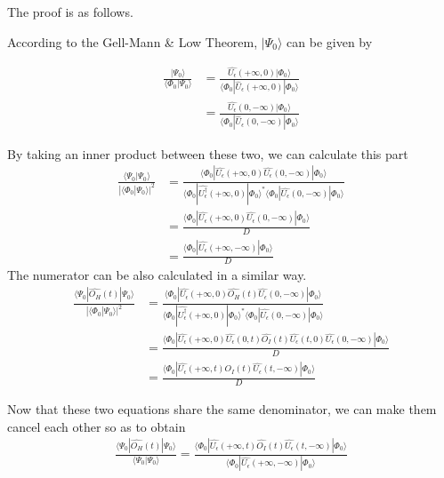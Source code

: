The proof is as follows.

According to the Gell-Mann \& Low Theorem, $|\Psi_0\rangle$ can be given by

\begin{align}
\frac{|\Psi_0\rangle}{\langle\Phi_0|\Psi_0\rangle}&=\frac{\hat{U_{\epsilon}}(+\infty,0)|\Phi_0\rangle}{\langle\Phi_0|\hat U_{\epsilon}(+\infty,0)|\Phi_0\rangle} \nonumber \\
&=\frac{\hat{U_{\epsilon}}(0,-\infty)|\Phi_0\rangle}{\langle\Phi_0|\hat U_{\epsilon}(0,-\infty)|\Phi_0\rangle} \nonumber
\end{align}

By taking an inner product between these two, we can calculate this part
\begin{align}
\frac{\langle\Psi_0|\Psi_0\rangle}{|\langle\Phi_0|\Psi_0\rangle|^2}&=\frac{\langle\Phi_0|\hat{U_{\epsilon}}(+\infty,0)\hat{U_{\epsilon}}(0,-\infty)|\Phi_0\rangle}{\langle\Phi_0|\hat{U^{\dagger}_{\epsilon}}(+\infty,0)|\Phi_0\rangle^*\langle\Phi_0|\hat{U_{\epsilon}}(0,-\infty)|\Phi_0\rangle} \nonumber \\
&=\frac{\langle\Phi_0|\hat{U_{\epsilon}}(+\infty,0)\hat{U_{\epsilon}}(0,-\infty)|\Phi_0\rangle}{D} \nonumber \\
&= \frac{\langle\Phi_0|\hat{U_{\epsilon}}(+\infty,-\infty)|\Phi_0\rangle}{D} \nonumber
\end{align}
The numerator can be also calculated in a similar way.
\begin{align}
\frac{\langle\Psi_0|\hat{O_H}(t)|\Psi_0\rangle}{|\langle\Phi_0|\Psi_0\rangle|^2}&=\frac{\langle\Phi_0|\hat{U_{\epsilon}}(+\infty,0)\hat{O_H}(t)\hat{U_{\epsilon}}(0,-\infty)|\Phi_0\rangle}{\langle\Phi_0|\hat{U^{\dagger}_{\epsilon}}(+\infty,0)|\Phi_0\rangle^*\langle\Phi_0|\hat{U_{\epsilon}}(0,-\infty)|\Phi_0\rangle} \nonumber \\
&=\frac{\langle\Phi_0|\hat{U_{\epsilon}}(+\infty,0)\hat{U_{\epsilon}}(0,t)\hat{O_I}(t)\hat{U_{\epsilon}}(t,0)\hat{U_{\epsilon}}(0,-\infty)|\Phi_0\rangle}{D} \nonumber \\
&=\frac{\langle\Phi_0|\hat{U_{\epsilon}}(+\infty,t)\hat{O_I}(t)\hat{U_{\epsilon}}(t,-\infty)|\Phi_0\rangle}{D} \nonumber
\end{align}


Now that these two equations share the same denominator, we can make them cancel each other so as to obtain
\begin{align}
\frac{\langle\Psi_0|\hat{O_H}(t)|\Psi_0\rangle}{\langle\Psi_0|\Psi_0\rangle}=\frac{\langle\Phi_0|\hat{U_{\epsilon}}(+\infty,t)\hat{O_I}(t)\hat{U_{\epsilon}}(t,-\infty)|\Phi_0\rangle}{\langle\Phi_0|\hat{U_{\epsilon}}(+\infty,-\infty)|\Phi_0\rangle}\nonumber
\end{align}

